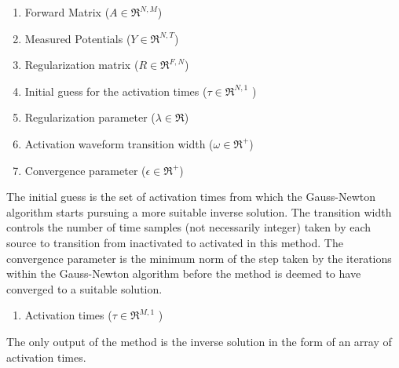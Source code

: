     \begin{enumerate}
        \item Forward Matrix ($A\in\Re^{N,M}$)
        \item Measured Potentials ($Y\in\Re^{N,T}$)
        \item Regularization matrix ($R\in\Re^{F,N}$)
        \item Initial guess for the activation times ($\tau\in\Re^{N,1}$ )
        \item Regularization parameter ($\lambda\in\Re$)
        \item Activation waveform transition width ($\omega\in\Re^{+}$)
        \item Convergence parameter ($\epsilon\in\Re^{+}$)
    \end{enumerate}
    The initial guess is the set of activation times from which the Gauss-Newton algorithm starts pursuing a more suitable inverse solution. 
    The transition width controls the number of time samples (not necessarily integer) taken by each source to transition from inactivated to activated in this method. 
    The convergence parameter is the minimum norm of the step taken by the iterations within the Gauss-Newton algorithm before the method is deemed to have converged to a suitable solution. 
    
    \begin{enumerate}
        \item Activation times ($\tau\in\Re^{M,1}$ )
    \end{enumerate}
    The only output of the method is the inverse solution in the form of an array of activation times.
    



    
